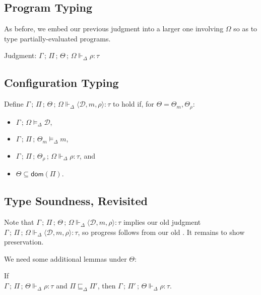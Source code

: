 \documentclass{article}
\newcommand{\mf}[1]{\mathsf{#1}}
\newcommand{\mc}[1]{\mathcal{#1}}
\newcommand{\mb}[1]{\mathbf{#1}}
\newcommand{\semi}{\,;\,}
\newcommand{\dom}{\mf{dom}}
\newcommand{\pair}[2]{\langle #1, #2 \rangle}
\newcommand{\trip}[3]{\langle #1, #2, #3 \rangle}
\newcommand{\rtp}{\tau}
\newcommand{\tprog}[3]{#1 \vdash_\Delta #2: #3}
\newcommand{\tdef}[3]{#1 \semi #2 \vDash_\Delta #3}
\newcommand{\tcfg}[7]{#1 \semi #2 \semi #3 \Vdash_\Delta \trip{#4}{#5}{#6} : #7}
\newcommand{\tmeml}[4]{#1 \semi #2 \semi #3 \vDash_\Delta #4}
\newcommand{\trhol}[5]{#1 \semi #2 \semi #3 \Vdash_\Delta #4: #5}
\newcommand{\trhop}[6]{#1 \semi #2 \semi #3 \semi #4 \Vdash_\Delta #5: #6}
\newcommand{\tcfgl}[8]{#1 \semi #2 \semi #3 \semi #4 \Vdash_\Delta \trip{#5}{#6}{#7} : #8}
\newcommand{\podl}{\sqsubseteq_\Delta}
\newcommand{\tone}{\mb{1}}
\newcommand{\C}{\mc{C}}
\newcommand{\D}{\mc{D}}
\newcommand{\eprog}[1]{\mf{prog}\ #1}
\begin{document}
\subsection{Program Typing}

As before, we embed our previous judgment into a larger one
involving $\Omega$ so as to type partially-evaluated programs.

Judgment: $\trhop{\Gamma}{\Pi}{\Theta}{\Omega}{\rho}{\rtp}$

\subsection{Configuration Typing}

Define $\tcfgl{\Gamma}{\Pi}{\Theta}{\Omega}{\D}{m}{\rho}{\rtp}$
to hold if, for $\Theta=\Theta_m,\Theta_\rho$:
\begin{itemize}
\item $\tdef{\Gamma}{\Omega}{\D}$,
\item $\tmeml{\Gamma}{\Pi}{\Theta_m}{m}$,
\item $\trhop{\Gamma}{\Pi}{\Theta_\rho}{\Omega}{\rho}{\rtp}$, and
\item $\Theta \subseteq \dom(\Pi)$.
\end{itemize}

\subsection{Type Soundness, Revisited}

Note that
$\tcfgl{\Gamma}{\Pi}{\Theta}{\Omega}{\D}{m}{\rho}{\rtp}$
implies our old judgment
$\tcfg{\Gamma}{\Pi}{\Omega}{\D}{m}{\rho}{\rtp}$,
so progress follows from our old .
It remains to show preservation.

We need some additional lemmas under $\Theta$:

\begin{proposition}
\label{thm:wkpirl}
If\\$\trhol{\Gamma}{\Pi}{\Theta}{\rho}{\rtp}$ and $\Pi \podl \Pi'$,
then $\trhol{\Gamma}{\Pi'}{\Theta}{\rho}{\rtp}$.
\end{proposition}
\end{document}
